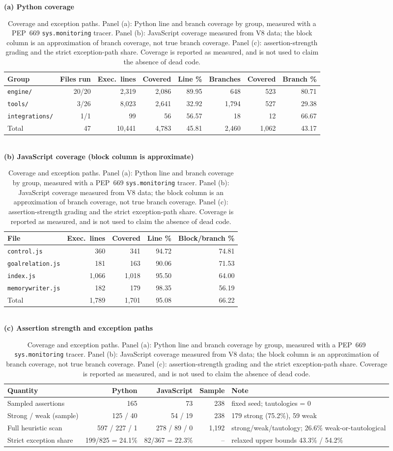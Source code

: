 \begin{table}[t]
\centering
\caption{Coverage and exception paths. Panel (a): Python line and branch
coverage by group, measured with a PEP~669 \texttt{sys.monitoring} tracer.
Panel (b): JavaScript coverage measured from V8 data; the block column is an
approximation of branch coverage, not true branch coverage. Panel (c):
assertion-strength grading and the strict exception-path share. Coverage is
reported as measured, and is not used to claim the absence of dead code.}
\label{tab:coverage}
\small
\textbf{(a) Python coverage}\\[2pt]
\begin{tabular}{lrrrrrrr}
\toprule
Group & Files run & Exec.\ lines & Covered & Line \% & Branches & Covered & Branch \% \\
\midrule
\texttt{engine/}        & 20/20 & 2{,}319 & 2{,}086 & 89.95 & 648  & 523  & 80.71 \\
\texttt{tools/}         & 3/26  & 8{,}023 & 2{,}641 & 32.92 & 1{,}794 & 527 & 29.38 \\
\texttt{integrations/}  & 1/1   &    99 &    56 & 56.57 & 18   & 12   & 66.67 \\
Total                   & 47    & 10{,}441 & 4{,}783 & 45.81 & 2{,}460 & 1{,}062 & 43.17 \\
\bottomrule
\end{tabular}\\[6pt]
\textbf{(b) JavaScript coverage (block column is approximate)}\\[2pt]
\begin{tabular}{lrrrr}
\toprule
File & Exec.\ lines & Covered & Line \% & Block/branch \% \\
\midrule
\texttt{control.js}      &   360 &   341 & 94.72 & 74.81 \\
\texttt{goalrelation.js} &   181 &   163 & 90.06 & 71.53 \\
\texttt{index.js}        & 1{,}066 & 1{,}018 & 95.50 & 64.00 \\
\texttt{memorywriter.js} &   182 &   179 & 98.35 & 56.19 \\
Total                    & 1{,}789 & 1{,}701 & 95.08 & 66.22 \\
\bottomrule
\end{tabular}\\[6pt]
\textbf{(c) Assertion strength and exception paths}\\[2pt]
\begin{tabular}{@{}l r r r p{}@{}}
\toprule
Quantity & Python & JavaScript & Sample & Note \\
\midrule
Sampled assertions            & 165 &  73 & 238 & fixed seed; tautologies = 0 \\
Strong / weak (sample)        & 125 / 40 & 54 / 19 & 238 & 179 strong (75.2\%), 59 weak \\
Full heuristic scan           & 597 / 227 / 1 & 278 / 89 / 0 & 1{,}192 & strong/weak/tautology; 26.6\% weak-or-tautological \\
Strict exception share        & 199/825 = 24.1\% & 82/367 = 22.3\% & -- & relaxed upper bounds 43.3\% / 54.2\% \\
\bottomrule
\end{tabular}
\end{table}

